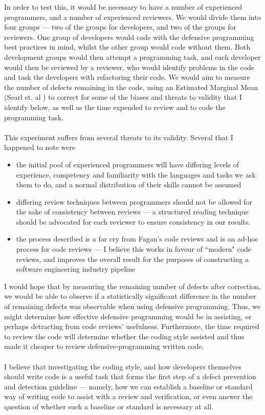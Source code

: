In order to test this, it would be necessary to have a number of experienced programmers, and a
number of experienced reviewers.
We would divide them into four groups --- two of the groups for developers, and two of the groups
for reviewers.
One group of developers would code with the defensive programming best practices in mind, whilst the
other group would code without them.
Both development groups would then attempt a programming task, and each developer would then be
reviewed by a reviewer, who would identify problems in the code and task the developers with
refactoring their code.
We would aim to measure the number of defects remaining in the code, using an Estimated Marginal
Mean (Searl et. al \FIXME) to correct for some of the biases and threats to validity that I identify
below, as well as the time expended to review and to code the programming task.\\
\\
This experiment suffers from several threats to its validity.
Several that I happened to note were
\begin{itemize}
	\item the initial pool of experienced programmers will have differing levels of experience,
		competency and familiarity with the languages and tasks we ask them to do, and a normal
		distribution of their skills cannot be assumed
	\item differing review techniques between programmers should not be allowed for the sake of
		consistency between reviews --- a structured reading technique should be advocated for each
		reviewer to ensure consistency in our results.
	\item the process described is a far cry from Fagan's code reviews and is an ad-hoc process for
		code reviews --- I believe this works in favour of ``modern" code reviews, and improves the
		overall result for the purposes of constructing a software engineering industry pipeline
\end{itemize}

I would hope that by measuring the remaining number of defects after correction, we would be able to
observe if a statistically significant difference in the number of remaining defects was observable
when using defensive programming.
Thus, we might determine how effective defensive programming would be in assisting, or perhaps detracting from code reviews' usefulness.
Furthermore, the time required to review the code will determine whether the coding style assisted
and thus made it cheaper to review defensive-programming written code.\\
\\
I believe that investigating the coding style, and how developers themselves should write code is a
useful task that forms the first step of a defect prevention and detection guideline --- namely, how
we can establish a baseline or standard way of writing code to assist with a review and
verification, or even answer the question of whether such a baseline or standard is necessary at
all.

